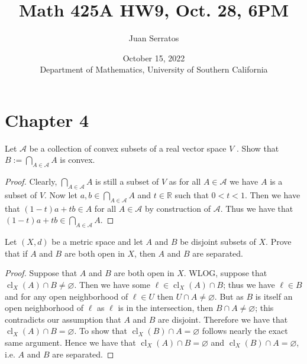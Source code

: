 \documentclass[oneside]{amsart}
\title{Math 425A HW9, Oct. 28, 6PM}
\author{Juan Serratos}
\date{October 15, 2022 \\ {Department of Mathematics, University of Southern California}}
\theoremstyle{definition}
\newcommand{\rr}{\mathbb R}
\DeclareMathOperator{\cl}{cl}
\begin{document}
\maketitle
\setcounter{tocdepth}{4}
\setcounter{secnumdepth}{4}
 \section{Chapter 4}

\begin{tcolorbox}[colback=black!5!white,colframe=black!75!black,title= Chapter $4$; $\S 6.1$: Exercise $6.1.$] Let $\mathcal A$ be a collection of convex subsets of a real vector space $V$ . Show that $B:= \bigcap_{A \in \mathcal A} A$ is convex.
\tcblower 
\begin{proof}
	Clearly, $ \bigcap_{A \in \mathcal A} A$ is still a subset of $V$ as for all $A \in \mathcal A$ we have $A$ is a subset of $V$. Now let $a, b \in \bigcap_{A \in \mathcal A} A$ and $t \in \rr$ such that $0 < t < 1$. Then we have that $(1-t)a + tb \in A$ for all $A \in \mathcal A$ by construction of $\mathcal A$. Thus we have that $(1-t)a+tb \in \bigcap_{A \in \mathcal A} A$. 
\end{proof}
\end{tcolorbox}

\begin{tcolorbox}[colback=black!5!white,colframe=black!75!black,title= Chapter $4$; $\S 6.2$: Exercise $6.2.$]  Let $(X, d)$ be a metric space and let $A$ and $B$ be disjoint subsets of $X$. Prove that if $A$ and $B$ are both open in $X$, then $A$ and $B$ are separated.
\tcblower 
\begin{proof} Suppose that $A$ and $B$ are both open in $X$. WLOG, suppose that $\cl_X(A) \cap B \neq \varnothing$. Then we have some $\ell \in \cl_X(A) \cap B$; thus we have $\ell \in B$ and for any open neighborhood of $\ell \in U$ then $U \cap A \neq \varnothing$. But as $B$ is itself an open neighborhood of $\ell$ as $\ell$ is in the intersection, then $B \cap A \neq \varnothing$; this contradicts our assumption that $A$ and $B$ are disjoint. Therefore we have that $\cl_X(A) \cap B = \varnothing$. To show that $\cl_X(B) \cap A = \varnothing$ follows nearly the exact same argument. Hence we have that $\cl_X(A) \cap B = \varnothing$ and $\cl_X(B) \cap A = \varnothing$, i.e. $A$ and $B$ are separated. 
\end{proof}
\end{tcolorbox}
 
\end{document}
